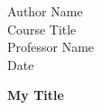 \documentclass[12pt]{article}
\newcommand{\titletext}[1]
{\begin{center}
		\textbf{#1}
\end{center}}
\newcommand{\headertext}[4]
{\begin{flushleft}
		#1
		\\ #2
		\\ #3
		\\ #4
\end{flushleft}}
\begin{document}
\headertext{Author Name}{Course Title}{Professor Name}{Date}

\titletext{My Title}
	
\end{document}
